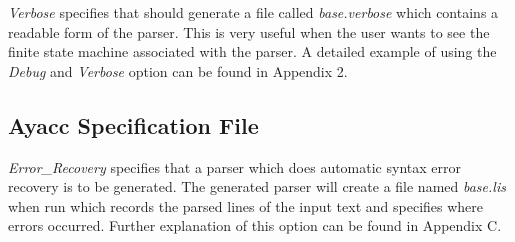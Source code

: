 {\it Verbose} specifies that \ayacc should generate a file called
{\it base.verbose}
which contains a readable form of the parser.  This is very useful when
the user wants to see the finite state machine associated with the
parser.  A detailed example of using the {\it Debug} and {\it Verbose}
option can be found in Appendix 2.
\subsection{Ayacc Specification File}

{\it Error\_Recovery} specifies that a parser which does automatic
syntax error recovery is to be generated.  The generated parser will
create a file named {\it base.lis} when run which records the parsed
lines of the input text and specifies where errors occurred.  Further
explanation of this option can be found in Appendix C.

